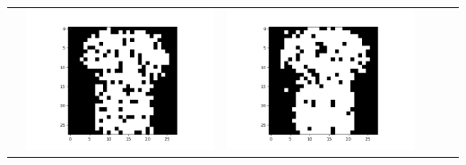 \documentclass[12pt]{report}
\begin{document}
\begin{table}[H]
\begin{tabular}{  c  c  c  c  c  c }
\begin{minipage}{.15\textwidth}
    \end{minipage} &
    \begin{minipage}{.15\textwidth}
      \includegraphics[scale=0.2]{BM_a2.png}
    \end{minipage} &
    \begin{minipage}{.15\textwidth}
      \includegraphics[scale=0.2]{BM_a4.png}
    \end{minipage} &
    \begin{minipage}{.15\textwidth}

\end{minipage}
\end{tabular}
\end{table}
\end{document}
